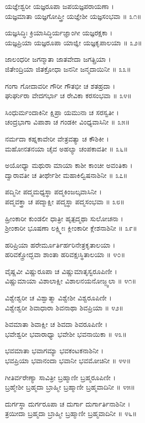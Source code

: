 ಯಜ್ಞೇಶ್ವರೀ ಯಜ್ಞರೂಪಾ ಜಪಯಜ್ಞಪರಾಯಣಾ ।\\
ಯಜ್ಞಮಾತಾ ಯಜ್ಞಗೋಪ್ತ್ರೀ ಯಜ್ಞೇಶೀ ಯಜ್ಞಸಂಭವಾ ॥ ೩೧॥

ಯಜ್ಞಸಿದ್ಧಿಃ ಕ್ರಿಯಾಸಿದ್ಧಿರ್ಯಜ್ಞಾಂಗೀ ಯಜ್ಞರಕ್ಷಕಾ ।\\
ಯಜ್ಞಪ್ರಿಯಾ ಯಜ್ಞರೂಪಾ ಯಾಜ್ಞೀ ಯಜ್ಞಕೃಪಾಲಯಾ ॥ ೩೨॥

ಜಾಲಂಧರೀ ಜಗನ್ಮಾತಾ ಜಾತವೇದಾ ಜಗತ್ಪ್ರಿಯಾ ।\\
ಜಿತೇಂದ್ರಿಯಾ ಜಿತಕ್ರೋಧಾ ಜನನೀ ಜನ್ಮದಾಯಿನೀ ॥ ೩೩॥

ಗಂಗಾ ಗೋದಾವರೀ ಗೌರೀ ಗೌತಭೀ ಚ ಶತಹ್ರದಾ ।\\
ಘುರ್ಘುರಾ ವೇದಗರ್ಭಾ ಚ ರೇವಿಕಾ ಕರಸಂಭವಾ ॥ ೩೪॥

ಸಿಂಧುರ್ಮಂದಾಕಿನೀ ಕ್ಷಿಪ್ರಾ ಯಮುನಾ ಚ ಸರಸ್ವತೀ ।\\
ಚಂದ್ರಭಾಗಾ ವಿಪಾಶಾ ಚ ಗಂಡಕೀ ವಿಂಧ್ಯವಾಸಿನೀ ॥ ೩೫॥

ನರ್ಮದಾ ಕಹ್ನಕಾವೇರೀ ವೇತ್ರವತ್ಯಾ ಚ ಕೌಶಿಕೀ ।\\
ಮಹೋನತನಯಾ ಚೈವ ಅಹಲ್ಯಾ ಚಂಪಕಾವತೀ ॥ ೩೬॥

ಅಯೋಧ್ಯಾ ಮಥುರಾ ಮಾಯಾ ಕಾಶೀ ಕಾಂಚೀ ಅವಂತಿಕಾ ।\\
ದ್ವಾರಾವತೀ ಚ ತೀರ್ಥೇಶೀ ಮಹಾಕಿಲ್ವಿಷನಾಶಿನೀ ॥ ೩೭॥

ಪದ್ಮಿನೀ ಪದ್ಮಮಧ್ಯಸ್ಥಾ ಪದ್ಮಕಿಂಜಲ್ಕವಾಸಿನೀ ।\\
ಪದ್ಮವಕ್ತ್ರಾ ಚ ಪದ್ಮಾಕ್ಷೀ ಪದ್ಮಸ್ಥಾ ಪದ್ಮಸಂಭವಾ ॥ ೩೮॥

ಹ್ರೀಂಕಾರೀ ಕುಂಡಲೀ ಧಾತ್ರೀ ಹೃತ್ಪದ್ಮಥಾ ಸುಲೋಚನಾ ।\\
ಶ್ರೀಂಕಾರೀ ಭೂಷಣಾ ಲಕ್ಷ್ಮೀಃ ಕ್ಲೀಂಕಾರೀ ಕ್ಲೇಶನಾಶಿನೀ ॥ ೩೯॥

ಹರಿಪ್ರಿಯಾ ಹರೇರ್ಮೂರ್ತಿರ್ಹರಿನೇತ್ರಕೃತಾಲಯಾ ।\\
ಹರಿವಕ್ತ್ರೋದ್ಭವಾ ಶಾಂತಾ ಹರಿವಕ್ಷಃಸ್ಥಿತಾಲಯಾ ॥ ೪೦॥

ವೈಷ್ಣವೀ ವಿಷ್ಣುರೂಪಾ ಚ ವಿಷ್ಣುಮಾತೃಸ್ವರೂಪಿಣೀ ।\\
ವಿಷ್ಣುಮಾಯಾ ವಿಶಾಲಾಕ್ಷೀ ವಿಶಾಲನಯನೋಜ್ಜ್ವಲಾ ॥ ೪೧॥

ವಿಶ್ವೇಶ್ವರೀ ಚ ವಿಶ್ವಾತ್ಮಾ ವಿಶ್ವೇಶೀ ವಿಶ್ವರೂಪಿಣೀ ।\\
ವಿಶ್ವೇಶ್ವರೀ ಶಿವಾಧಾರಾ ಶಿವನಾಥಾ ಶಿವಪ್ರಿಯಾ ॥ ೪೨॥

ಶಿವಮಾತಾ ಶಿವಾಕ್ಷೀ ಚ ಶಿವದಾ ಶಿವರೂಪಿಣೀ ।\\
ಭವೇಶ್ವರೀ ಭವಾರಾಧ್ಯಾ ಭವೇಶೀ ಭವನಾಯಿಕಾ ॥ ೪೩॥

ಭವಮಾತಾ ಭವಾಗಮ್ಯಾ ಭವಕಂಟಕನಾಶಿನೀ ।\\
ಭವಪ್ರಿಯಾ ಭವಾನಂದಾ ಭವಾನೀ ಭವಮೋಚಿನೀ ॥ ೪೪॥

ಗೀತಿರ್ವರೇಣ್ಯಾ ಸಾವಿತ್ರೀ ಬ್ರಹ್ಮಾಣೀ ಬ್ರಹ್ಮರೂಪಿಣೀ ।\\
ಬ್ರಹ್ಮೇಶೀ ಬ್ರಹ್ಮದಾ ಬ್ರಾಹ್ಮೀ ಬ್ರಹ್ಮಾಣೀ ಬ್ರಹ್ಮವಾದಿನೀ ॥ ೪೫॥

ದುರ್ಗಸ್ಥಾ ದುರ್ಗರೂಪಾ ಚ ದುರ್ಗಾ ದುರ್ಗಾರ್ತಿನಾಶಿನೀ ।\\
ತ್ರಯೀದಾ ಬ್ರಹ್ಮದಾ ಬ್ರಾಹ್ಮೀ ಬ್ರಹ್ಮಾಣೀ ಬ್ರಹ್ಮವಾದಿನೀ ॥ ೪೬॥

